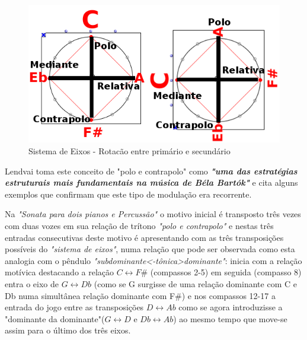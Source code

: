 \documentclass[
	12pt,				%
	openright,			%
	twoside,			%
	a4paper,			%
	english,			%
	french,				%
	spanish,			%
	brazil				%
	]{abntex2}
\begin{document}
\begin{figure}[!h]
	\caption{\label{fig_grafico}Sistema de Eixos - Rotacão entre primário e secundário}
	\begin{center}
	    \includegraphics[scale=0.6]{axis/PoloContrapolo.png}
	\end{center}
\end{figure}


Lendvai toma este conceito de "polo e contrapolo" como \textit{\textbf{"uma das estratégias estruturais mais fundamentais na música de Béla Bartók"}}\cite[ p.04]{lendvai1971bela} e cita alguns exemplos que confirmam que este tipo de modulação era recorrente.
\pagebreak 
 
Na \textit{"Sonata para dois pianos e Percussão"} o motivo inicial é transposto três vezes com duas vozes em sua relação de trítono \textit{"polo e contrapolo"} e nestas três entradas consecutivas deste motivo é apresentando com as três transposições possíveis do \textit{"sistema de eixos"}, numa relação que pode ser observada como esta analogia com o pêndulo \textit{"subdominante<-tônica>dominante"}: inicia com a relação motívica destacando a relação $C \leftrightarrow F\#$ (compassos 2-5) em seguida (compasso 8) entra o eixo de $G \leftrightarrow Db$ (como se G surgisse de uma relação dominante com C e Db numa simultânea relação dominante com F\#) e nos compassos 12-17 a entrada do jogo entre as transposições $D \leftrightarrow Ab$ como se agora introduzisse a "dominante da dominante"($G \leftrightarrow D$ e $Db \leftrightarrow Ab$) ao mesmo tempo que move-se assim para o último dos três eixos.
\end{document}

